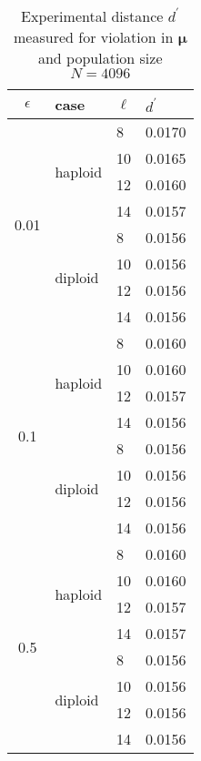 \begin{table}[ht]
\caption{Experimental distance $d^\prime$ measured for violation in $\bm{\mu}$ and population size $N = 4096$ }
\centering
\begin{tabularx}{0.75\textwidth}{ c *{3}{X}}
\toprule
$\epsilon$ & case & $\ell$ & $d^\prime$ \\
\midrule
\multirow{8}{*}{0.01} & \multirow{4}{*}{haploid} 	& 8 & 0.0170 \\
		      &   				& 10 & 0.0165 \\ 
		      & 			 	& 12 & 0.0160 \\
		      &  	 			& 14 & 0.0157 \\ 
		      \cmidrule(l){2-4}
		      & \multirow{4}{*}{diploid} 	& 8 & 0.0156 \\
		      &  	 			& 10 & 0.0156 \\
		      & 			 	& 12 & 0.0156 \\
		      &  	 			& 14 & 0.0156 \\
		      \midrule
\multirow{8}{*}{0.1} & \multirow{4}{*}{haploid} 	& 8 & 0.0160 \\
		      &   				& 10 & 0.0160 \\	
		      & 				& 12 & 0.0157 \\	
		      &  	 			& 14 & 0.0156 \\
		      \cmidrule(l){2-4}
		      & \multirow{4}{*}{diploid} 	& 8 & 0.0156 \\
		      &  	 			& 10 & 0.0156 \\
		      & 				& 12 & 0.0156 \\
		      &  	 			& 14 & 0.0156 \\
		      \midrule
\multirow{8}{*}{0.5} & \multirow{4}{*}{haploid} 	& 8 & 0.0160 \\
		      &   				& 10 & 0.0160 \\
		      & 				& 12 & 0.0157 \\
		      &  	 			& 14 & 0.0157 \\
		      \cmidrule(l){2-4}
		      & \multirow{4}{*}{diploid} 	& 8 & 0.0156 \\	
		      &  	 			& 10 & 0.0156 \\
		      &  				& 12 & 0.0156 \\
		      &  	 			& 14 & 0.0156 \\
\bottomrule
\end{tabularx}
\label{ditanceMu4096}
\end{table} 


